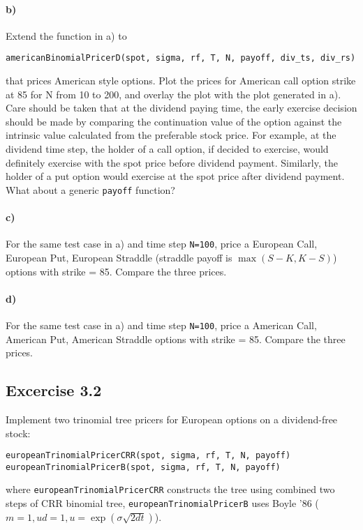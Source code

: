 \documentclass[12pt,a4paper,hidelinks,fleqn]{article}            %
\begin{document}
\vspace{-1cm}
\paragraph{b)} Extend the function in a) to 
\vspace{-5mm}
\begin{verbatim}
americanBinomialPricerD(spot, sigma, rf, T, N, payoff, div_ts, div_rs)
\end{verbatim}
\vspace{-5mm}
that prices American style options. 
Plot the prices for American call option strike at 85 for N from 10 to 200, and overlay the plot with the plot generated in a). 
Care should be taken that at the dividend paying time, 
the early exercise decision should be made by comparing the continuation value of the option against the intrinsic value calculated from the preferable stock price.
For example, at the dividend time step, the holder of a call option, if decided to exercise, would definitely exercise with the spot price before dividend payment.
Similarly, the holder of a put option would exercise at the spot price after dividend payment.
What about a generic \verb=payoff= function? 

\vspace{-1cm}
\paragraph{c)} For the same test case in a) and time step \verb-N=100-, 
price a European Call, European Put, European Straddle (straddle payoff is $\max(S-K, K-S)$) options with strike = 85. 
Compare the three prices.
\vspace{-1cm}
\paragraph{d)} For the same test case in a) and time step \verb-N=100-, 
price a American Call, American Put, American Straddle options with strike = 85. 
Compare the three prices.

\subsection*{Excercise 3.2}
Implement two trinomial tree pricers for European options on a dividend-free stock:  
\vspace{-5mm}
\begin{verbatim}
europeanTrinomialPricerCRR(spot, sigma, rf, T, N, payoff)
europeanTrinomialPricerB(spot, sigma, rf, T, N, payoff)
\end{verbatim}
\vspace{-5mm}
where \verb=europeanTrinomialPricerCRR= constructs the tree using combined two steps of CRR binomial tree,
\verb=europeanTrinomialPricerB= uses Boyle '86 ($m=1, ud=1, u = \exp(\sigma\sqrt{2dt})$).
\end{document}
